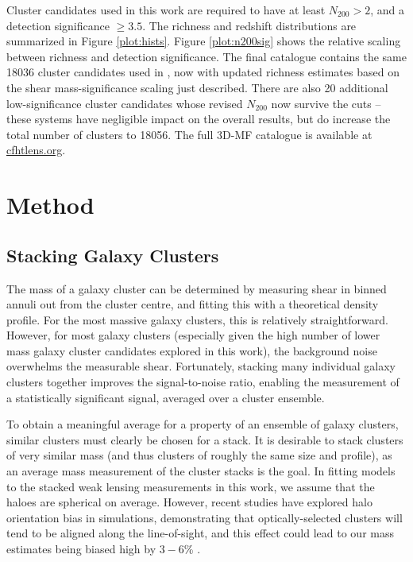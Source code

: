 Cluster candidates used in this work are required to have at least $N_{200} > 2$, and a detection significance $\ge 3.5$. The richness and redshift distributions are summarized in Figure \ref{plot:hists}. Figure \ref{plot:n200sig} shows the relative scaling between richness and detection significance. The final catalogue contains the same 18036 cluster candidates used in \citet{Ford14}, now with updated richness estimates based on the shear mass-significance scaling just described. There are also 20 additional low-significance cluster candidates whose revised $N_{200}$ now survive the cuts -- these systems have negligible impact on the overall results, but do increase the total number of clusters to 18056. The full \ac{3D-MF} catalogue is available at \url{cfhtlens.org}.  



\section{Method}
\label{method}

\subsection{Stacking Galaxy Clusters}

The mass of a galaxy cluster can be determined by measuring shear in binned annuli out from the cluster centre, and fitting this with a theoretical density profile. For the most massive galaxy clusters, this is relatively straightforward. However, for most galaxy clusters (especially given the high number of lower mass galaxy cluster candidates explored in this work), the background noise overwhelms the measurable shear.  Fortunately, stacking many individual galaxy clusters together improves the signal-to-noise ratio, enabling the measurement of a statistically significant signal, averaged over a cluster ensemble.

To obtain a meaningful average for a property of an ensemble of galaxy clusters, similar clusters must clearly be chosen for a stack. It is desirable to stack clusters of very similar mass (and thus clusters of roughly the same size and profile), as an average mass measurement of the cluster stacks is the goal. In fitting models to the stacked weak lensing measurements in this work, we assume that the haloes are spherical on average. However, recent studies have explored halo orientation bias in simulations, demonstrating that optically-selected clusters will tend to be aligned along the line-of-sight, and this effect could lead to our mass estimates being biased high by $3-6$\% \citep{Dietrich14}.

